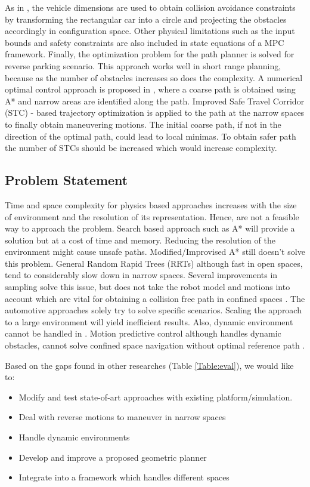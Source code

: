 \documentclass[rnd]{mas_proposal}
\begin{document}
As in \cite{9564599}, the vehicle dimensions are used to obtain collision avoidance constraints by transforming the rectangular car into a circle and projecting the obstacles accordingly in configuration space. Other physical limitations such as the input bounds and safety constraints are also included in state equations of a MPC framework. Finally, the optimization problem for the path planner is solved for reverse parking scenario. This approach works well in short range planning, because as the number of obstacles increases so does the complexity. A numerical optimal control approach is proposed in \cite{9491138}, where a coarse path is obtained using A* and narrow areas are identified along the path. Improved Safe Travel Corridor (STC) - based trajectory optimization is applied to the path at the narrow spaces to finally obtain maneuvering motions. The initial coarse path, if not in the direction of the optimal path, could lead to local minimas. To obtain safer path the number of STCs should be increased which would increase complexity.

\subsection{Problem Statement}
Time and space complexity for physics based approaches \cite{1511035} \cite{6821131} increases with the size of environment and the resolution of its representation. Hence, are not a feasible way to approach the problem.
Search based approach such as A* will provide a solution but at a cost of time and memory. Reducing the resolution of the environment might cause unsafe paths. Modified/Improvised A* \cite{9491138} \cite{6876211} still doesn’t solve this problem.
General Random Rapid Trees (RRTs) although fast in open spaces, tend to considerably slow down in narrow spaces. Several improvements in sampling solve this issue, but does not take the robot model and motions into account which are vital for obtaining a collision free path in confined spaces \cite{8961757} \cite{9561207} \cite{9536671} \cite{8324439}.
The automotive approaches solely try to solve specific scenarios. Scaling the approach to a large environment will yield inefficient results. Also, dynamic environment cannot be handled in \cite{9564599} \cite{7061856} \cite{7880346}. 
Motion predictive control although handles dynamic obstacles, cannot solve confined space navigation without optimal reference path \cite{8022960}.

Based on the gaps found in other researches (Table \ref{Table:eval}), we would like to:
\begin{itemize}
    \item Modify and test state-of-art approaches with existing platform/simulation.
    \item Deal with reverse motions to maneuver in narrow spaces
    \item Handle dynamic environments
    \item Develop and improve a proposed geometric planner
    \item Integrate into a framework which handles different spaces
\end{itemize}
\end{document}
